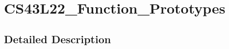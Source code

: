 \hypertarget{group___c_s43_l22___function___prototypes}{}\section{C\+S43\+L22\+\_\+\+Function\+\_\+\+Prototypes}
\label{group___c_s43_l22___function___prototypes}


\subsection{Detailed Description}

